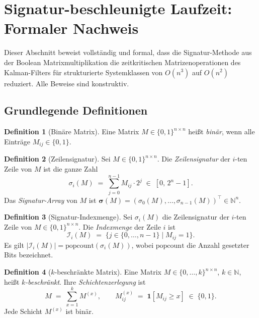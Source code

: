 ﻿\documentclass[a4paper,12pt]{article}
\theoremstyle{definition}
\newtheorem{definition}{Definition}
\begin{document}
\section{Signatur-beschleunigte Laufzeit: Formaler Nachweis}
\label{sec:laufzeit}

Dieser Abschnitt beweist vollständig und formal, dass die Signatur-Methode
aus der Boolean Matrixmultiplikation \cite{epp2026boolmm} die zeitkritischen
Matrizenoperationen des Kalman-Filters für strukturierte Systemklassen von
$O(n^3)$ auf $O(n^2)$ reduziert. Alle Beweise sind konstruktiv.

\subsection{Grundlegende Definitionen}

\begin{definition}[Binäre Matrix]
    Eine Matrix $M \in \{0,1\}^{n \times n}$ heißt \emph{binär}, wenn alle
    Einträge $M_{ij} \in \{0,1\}$.
\end{definition}

\begin{definition}[Zeilensignatur]
\label{def:rowsig}
    Sei $M \in \{0,1\}^{n \times n}$. Die \emph{Zeilensignatur} der $i$-ten Zeile
    von $M$ ist die ganze Zahl
    \[
        \sigma_i(M) \;=\; \sum_{j=0}^{n-1} M_{ij} \cdot 2^j \;\in\; [0,\, 2^n-1].
    \]
    Das \emph{Signatur-Array} von $M$ ist $\boldsymbol{\sigma}(M)
    = (\sigma_0(M), \ldots, \sigma_{n-1}(M))^\top \in \mathbb{N}^n$.
\end{definition}

\begin{definition}[Signatur-Indexmenge]
\label{def:idxset}
    Sei $\sigma_i(M)$ die Zeilensignatur der $i$-ten Zeile von $M \in \{0,1\}^{n\times n}$.
    Die \emph{Indexmenge} der Zeile $i$ ist
    \[
        \mathcal{I}_i(M) \;=\; \bigl\{j \in \{0,\ldots,n-1\} \mid M_{ij} = 1\bigr\}.
    \]
    Es gilt $|\mathcal{I}_i(M)| = \mathrm{popcount}(\sigma_i(M))$, wobei
    $\mathrm{popcount}$ die Anzahl gesetzter Bits bezeichnet.
\end{definition}

\begin{definition}[$k$-beschränkte Matrix]
    Eine Matrix $M \in \{0,\ldots,k\}^{n \times n}$, $k \in \mathbb{N}$, heißt
    \emph{$k$-beschränkt}. Ihre \emph{Schichtenzerlegung} ist
    \[
        M \;=\; \sum_{x=1}^{k} M^{(x)}, \qquad
        M^{(x)}_{ij} \;=\; \mathbf{1}[M_{ij} \geq x] \;\in\; \{0,1\}.
    \]
    Jede Schicht $M^{(x)}$ ist binär.
\end{definition}
\end{document}
